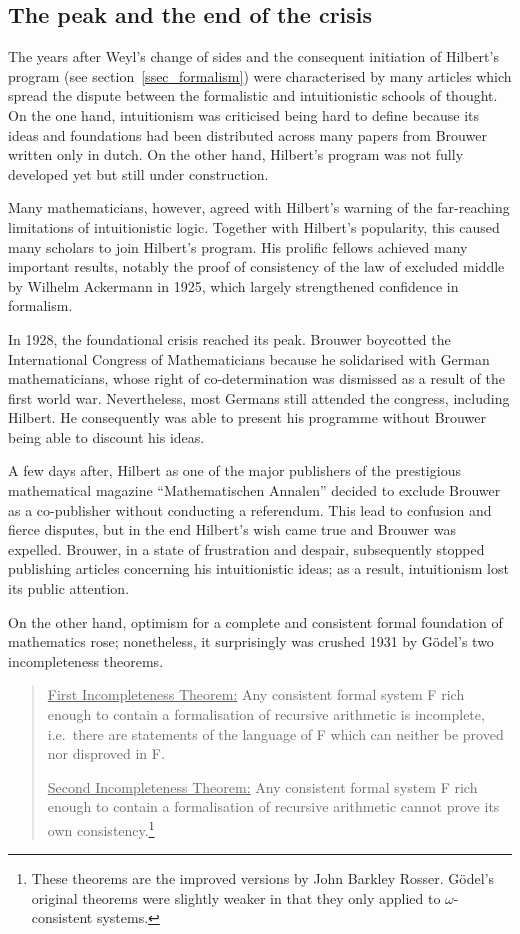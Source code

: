 \documentclass[hidelinks]{article}
\begin{document}
\subsection{The peak and the end of the crisis}\label{ssec_end_crisis}
The years after Weyl's change of sides and the consequent initiation of Hilbert's program (see section~\ref{ssec_formalism}) were characterised by many articles which spread the dispute between the formalistic and intuitionistic schools of thought. On the one hand, intuitionism was criticised being hard to define because its ideas and foundations had been distributed across many papers from Brouwer written only in dutch. On the other hand, Hilbert's program was not fully developed yet but still under construction.

Many mathematicians, however, agreed with Hilbert's warning of the far-reaching limitations of intuitionistic logic. Together with Hilbert's popularity, this caused many scholars to join Hilbert's program. His prolific fellows achieved many important results, notably the proof of consistency of the law of excluded middle by Wilhelm Ackermann in 1925, which largely strengthened confidence in formalism.

In 1928, the foundational crisis reached its peak. Brouwer boycotted the International Congress of Mathematicians because he solidarised with German mathematicians, whose right of co-determination was dismissed as a result of the first world war. Nevertheless, most Germans still attended the congress, including Hilbert. He consequently was able to present his programme without Brouwer being able to discount his ideas.

A few days after, Hilbert as one of the major publishers of the prestigious mathematical magazine ``Mathematischen Annalen'' decided to exclude Brouwer as a co-publisher without conducting a referendum. This lead to confusion and fierce disputes, but in the end Hilbert's wish came true and Brouwer was expelled. Brouwer, in a state of frustration and despair, subsequently stopped publishing articles concerning his intuitionistic ideas; as a result, intuitionism lost its public attention.  

On the other hand, optimism for a complete and consistent formal foundation of mathematics rose; nonetheless, it surprisingly was crushed 1931 by Gödel's two incompleteness theorems.

\begin{quote}
\underline{First Incompleteness Theorem:} Any consistent formal system F rich enough to contain a formalisation of recursive arithmetic is incomplete, i.e.\ there are statements of the language of F which can neither be proved nor disproved in F.

\underline{Second Incompleteness Theorem:} Any consistent formal system F rich enough to contain a formalisation of recursive arithmetic cannot prove its own consistency.\footnote{These theorems are the improved versions by John Barkley Rosser. Gödel's original theorems were slightly weaker in that they only applied to $\omega$-consistent systems.\cite[pp.~293--320]{fraenkel_incompleteness}}
\end{quote}
\end{document}
